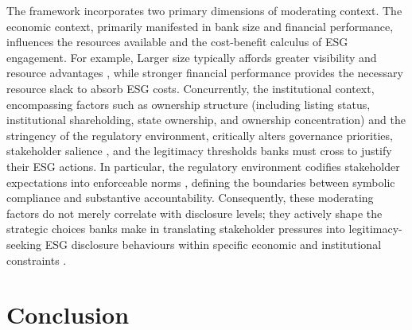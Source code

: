 \documentclass[
  authoryear]{elsarticle}
\begin{document}
The framework incorporates two primary dimensions of moderating
context.\hspace{0pt}\hspace{0pt} The \hspace{0pt}economic context,
primarily manifested in bank size and financial performance, influences
the resources available and the cost-benefit calculus of ESG engagement.
For example, Larger size typically affords \hspace{0pt}greater
visibility\hspace{0pt} \citep{MEZNAR1995} \hspace{0pt}and resource
advantages\hspace{0pt} \citep{YOUN2015, FAVINO2019}, while stronger
financial performance provides the \hspace{0pt}necessary resource
slack\hspace{0pt} \citep{HADDOCK2005, LIU2009, AGUINIS2012} to absorb
ESG costs. Concurrently, the \hspace{0pt}institutional context,
encompassing factors such as ownership structure (including listing
status, institutional shareholding, state ownership, and ownership
concentration) and the stringency of the regulatory environment,
critically alters \hspace{0pt}governance priorities, stakeholder
salience\hspace{0pt} \citep{MITCHELL1997}, and the
\hspace{0pt}legitimacy thresholds\hspace{0pt} banks must cross to
justify their ESG actions. In particular, the regulatory environment
\hspace{0pt}codifies stakeholder expectations into enforceable
norms\hspace{0pt} \citep{HESS2007, DESAI2024}, defining the boundaries
between symbolic compliance and substantive accountability.
Consequently, these moderating factors do not merely correlate with
disclosure levels; they \hspace{0pt}actively shape the strategic
choices\hspace{0pt} banks make in translating stakeholder pressures into
legitimacy-seeking ESG disclosure behaviours within specific economic
and institutional constraints \citep{CAMPBELL2007, AGUINIS2012}.

\section{Conclusion}\label{conclusion}
\end{document}
